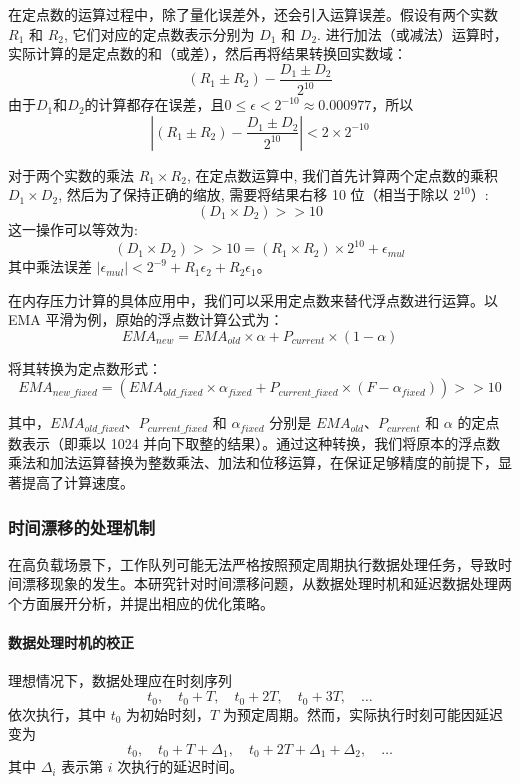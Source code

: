 在定点数的运算过程中，除了量化误差外，还会引入运算误差。假设有两个实数 \(R_1\) 和 \(R_2\), 它们对应的定点数表示分别为 \(D_1\) 和 \(D_2\). 进行加法（或减法）运算时，实际计算的是定点数的和（或差），然后再将结果转换回实数域：
\[
(R_1 \pm R_2) - \frac{D_1 \pm D_2}{2^{10}}
\]
由于\(D_1\)和\(D_2\)的计算都存在误差，且\(0 \leq \epsilon < 2^{-10} \approx 0.000977\)，所以
\[
|(R_1 \pm R_2) - \frac{D_1 \pm D_2}{2^{10}}| < 2 \times 2^{-10}
\]

对于两个实数的乘法 \(R_1 \times R_2\), 在定点数运算中, 我们首先计算两个定点数的乘积 \(D_1 \times D_2\), 然后为了保持正确的缩放, 需要将结果右移 10 位（相当于除以 \(2^{10}\)）:
\[
(D_1 \times D_2) >> 10
\]
这一操作可以等效为:
\[
(D_1 \times D_2) >> 10 = (R_1 \times R_2) \times 2^{10} + \epsilon_{mul}
\]
其中乘法误差 \(|\epsilon_{mul}| < 2^{-9} + R_1\epsilon_2 + R_2\epsilon_1\)。

在内存压力计算的具体应用中，我们可以采用定点数来替代浮点数进行运算。以 EMA 平滑为例，原始的浮点数计算公式为：
\[
EMA_{new} = EMA_{old} \times \alpha + P_{current} \times (1 - \alpha)
\]

将其转换为定点数形式：
\[
EMA_{new\_fixed} = (EMA_{old\_fixed} \times \alpha_{fixed} + P_{current\_fixed} \times (F - \alpha_{fixed})) >> 10
\]

其中，\(EMA_{old\_fixed}\)、\(P_{current\_fixed}\) 和 \(\alpha_{fixed}\) 分别是 \(EMA_{old}\)、\(P_{current}\) 和 \(\alpha\) 的定点数表示（即乘以 1024 并向下取整的结果）。通过这种转换，我们将原本的浮点数乘法和加法运算替换为整数乘法、加法和位移运算，在保证足够精度的前提下，显著提高了计算速度。

\subsubsection{时间漂移的处理机制}

在高负载场景下，工作队列可能无法严格按照预定周期执行数据处理任务，导致时间漂移现象的发生。本研究针对时间漂移问题，从数据处理时机和延迟数据处理两个方面展开分析，并提出相应的优化策略。

\paragraph{数据处理时机的校正}
理想情况下，数据处理应在时刻序列
\[
t_0, \quad t_0 + T, \quad t_0 + 2T, \quad t_0 + 3T, \quad \dots
\]
依次执行，其中 \(t_0\) 为初始时刻，\(T\) 为预定周期。然而，实际执行时刻可能因延迟变为
\[
t_0, \quad t_0 + T + \Delta_1, \quad t_0 + 2T + \Delta_1 + \Delta_2, \quad \dots
\]
其中 \(\Delta_i\) 表示第 \(i\) 次执行的延迟时间。

